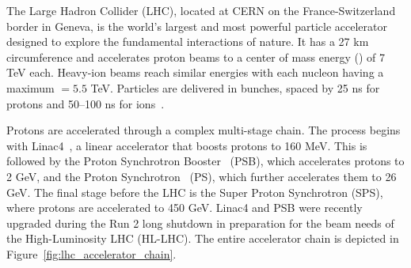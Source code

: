 



The Large Hadron Collider (LHC), located at CERN on the France-Switzerland border in Geneva, is the world's largest and most powerful particle accelerator designed to explore the fundamental interactions of nature. It has a 27 km circumference and accelerates proton beams to a center of mass energy (\com{}) of 7 TeV each. Heavy-ion beams reach similar energies with each nucleon having a maximum \com{} $= 5.5$ TeV. Particles are delivered in bunches, spaced by 25 ns for protons and 50--100 ns for ions~\cite{Alice_first_pb_2023}.

Protons are accelerated through a complex multi-stage chain. The process begins with Linac4~\cite{linac4_yellow_report}, a linear accelerator that boosts protons to 160 MeV. This is followed by the Proton Synchrotron Booster~\cite{PSB_paper} (PSB), which accelerates protons to 2 GeV, and the Proton Synchrotron~\cite{PS_paper} (PS), which further accelerates them to 26 GeV. The final stage before the LHC is the Super Proton Synchrotron (SPS), where protons are accelerated to 450 GeV. Linac4 and PSB were recently upgraded during the Run 2 long shutdown in preparation for the beam needs of the High-Luminosity LHC (HL-LHC)\cite{linac4_yellow_report,psb_ls2_upgrade}. The entire accelerator chain is depicted in Figure~\ref{fig:lhc_accelerator_chain}.

